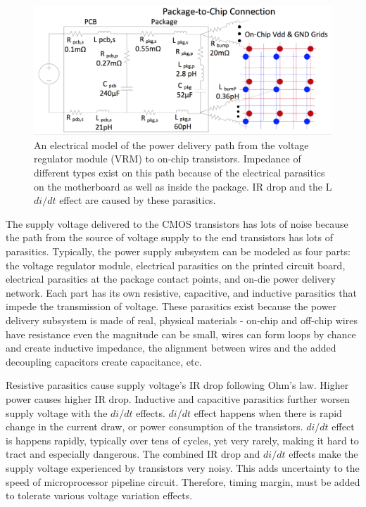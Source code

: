 \begin{figure}[t!]
  \centering
  \includegraphics[trim=0 0 0 0,clip,width=0.8\linewidth]{graphs/background/pdn-model.png}
  \caption{An electrical model of the power delivery path from the voltage regulator module (VRM) to on-chip transistors. Impedance of different types exist on this path because of the electrical parasitics on the motherboard as well as inside the package. IR drop and the L$di/dt$ effect are caused by these parasitics.}
  \label{fig:pdn-model}
\end{figure}

The supply voltage delivered to the CMOS transistors has lots of noise because the path from the source of voltage supply to the end transistors has lots of parasitics. Typically, the power supply subsystem can be modeled as four parts: the voltage regulator module, electrical parasitics on the printed circuit board, electrical parasitics at the package contact points, and on-die power delivery network. Each part has its own resistive, capacitive, and inductive parasitics that impede the transmission of voltage. These parasitics exist because the power delivery subsystem is made of real, physical materials - on-chip and off-chip wires have resistance even the magnitude can be small, wires can form loops by chance and create inductive impedance, the alignment between wires and the added decoupling capacitors create capacitance, etc.

Resistive parasitics cause supply voltage's IR drop following Ohm's law. Higher power causes higher IR drop. Inductive and capacitive parasitics further worsen supply voltage with the $di/dt$ effects. $di/dt$ effect happens when there is rapid change in the current draw, or power consumption of the transistors. $di/dt$ effect is happens rapidly, typically over tens of cycles, yet very rarely, making it hard to tract and especially dangerous. The combined IR drop and $di/dt$ effects make the supply voltage experienced by transistors very noisy. This adds uncertainty to the speed of microprocessor pipeline circuit. Therefore, timing margin, must be added to tolerate various voltage variation effects.

